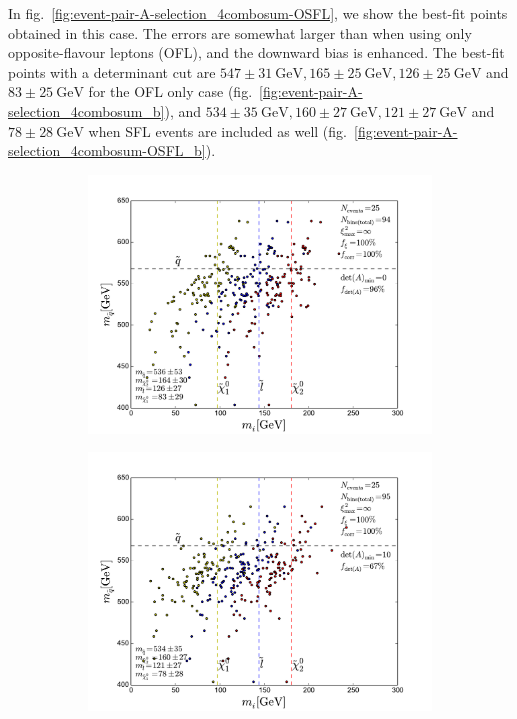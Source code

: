 \documentclass[twoside,english]{uiofysmaster}
\begin{document}
In fig.\ \ref{fig:event-pair-A-selection_4combosum-OSFL}, we show the best-fit points obtained in this case. The errors are somewhat larger than when using only opposite-flavour leptons (OFL), and the downward bias is enhanced. The best-fit points with a determinant cut are $547 \pm 31~\mathrm{GeV}, 165 \pm 25~\mathrm{GeV}, 126 \pm 25~\mathrm{GeV}$ and $83 \pm 25~\mathrm{GeV}$ for the OFL only case (fig.\ \ref{fig:event-pair-A-selection_4combosum_b}), and $534 \pm 35~\mathrm{GeV}, 160 \pm 27~\mathrm{GeV}, 121 \pm 27~\mathrm{GeV}$ and $78 \pm 28~\mathrm{GeV}$ when SFL events are included as well (fig.\ \ref{fig:event-pair-A-selection_4combosum-OSFL_b}).
\begin{figure}[hbt]
	\centering
	\begin{subfigure}[b]{0.45\textwidth}
		\includegraphics[width=\textwidth]{figures/improving_combinatorics/herwigpp-OSFL_nosmear_nodetAcut_A_matrix_algorithm_4combosum_TMP.pdf} 
		\caption{ }
		\label{fig:event-pair-A-selection_4combosum-OSFL_a}
	\end{subfigure}
	\begin{subfigure}[b]{0.45\textwidth}
		\includegraphics[width=\textwidth]{figures/improving_combinatorics/herwigpp-OSFL_nosmear_detAcut10_A_matrix_algorithm_4combosum_TMP.pdf}

\end{subfigure}
\end{figure}
\end{document}
